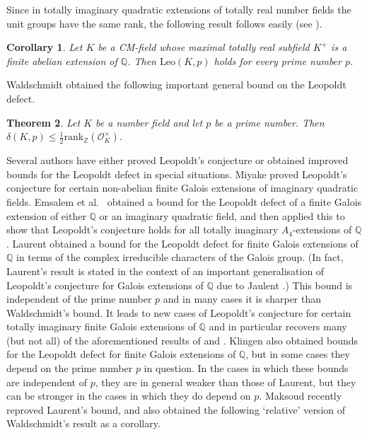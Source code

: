 \documentclass[12pt]{amsart}
\theoremstyle{plain}
\newtheorem{theorem}{Theorem}[section]
\newtheorem{corollary}[theorem]{Corollary}
\theoremstyle{remark}
\theoremstyle{definition}
\newcommand{\Z}{\mathbb{Z}}
\newcommand{\Q}{\mathbb{Q}}
\newcommand{\Leo}{\mathrm{Leo}}
\numberwithin{equation}{section}
\begin{document}
Since in totally imaginary quadratic extensions of totally real number fields the 
unit groups have the same rank,
the following result follows easily (see \cite[(10.3.11)]{MR2392026}).

\begin{corollary}
Let $K$ be a CM-field whose maximal totally real subfield $K^{+}$ is a finite abelian extension of $\Q$.
Then $\Leo(K,p)$ holds for every prime number $p$. 
\end{corollary}

Waldschmidt obtained the following important general bound on the Leopoldt defect.

\begin{theorem}\cite{MR608530}\label{thm:walbound}
Let $K$ be a number field and let $p$ be a prime number. 
Then $\delta(K,p) \leq \frac{1}{2}\mathrm{rank}_{\Z} (\mathcal{O}_{K}^{\times})$.
\end{theorem}

Several authors have either proved Leopoldt's conjecture or obtained improved bounds for the 
Leopoldt defect in special situations.   
Miyake \cite{MR659620} proved Leopoldt's conjecture for certain non-abelian finite Galois extensions of imaginary
quadratic fields. Emsalem et al.\ \cite{MR769790} obtained a bound for the Leopoldt 
defect of a finite Galois extension of either $\Q$ or an imaginary quadratic field, and 
then applied this to show that  Leopoldt's conjecture holds for all totally 
imaginary $A_{4}$-extensions of $\Q$.
Laurent \cite{MR1004134} obtained a bound for the Leopoldt defect for finite Galois extensions of $\Q$
in terms of the complex irreducible characters of the Galois group. 
(In fact, Laurent's result is stated in the context of an important generalisation of Leopoldt's conjecture for
Galois extensions of $\Q$ due to Jaulent \cite{MR790777}.)
This bound is independent of the prime number $p$ and in many cases it is sharper than Waldschmidt's bound.
It leads to new cases of Leopoldt's conjecture for certain totally imaginary finite Galois extensions of 
$\Q$ and in particular recovers many (but not all) of the aforementioned results of \cite{MR769790} and \cite{MR659620}.
Klingen \cite{MR1087978} also obtained bounds for the Leopoldt defect for finite Galois extensions
of $\Q$, but in some cases they depend on the prime number $p$ in question. 
In the cases in which these bounds are independent of $p$, they are in general weaker than those 
of Laurent, but they can be stronger in the cases in which they do depend on $p$.
Maksoud recently reproved Laurent's bound, and also obtained the
following `relative' version of Waldschmidt's result as a corollary.
\end{document}
